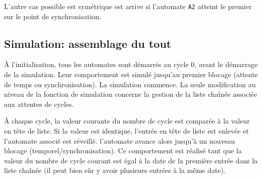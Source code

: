 \documentclass[11pt,a4paper]{article}
\begin{document}
L'autre cas possible est symétrique est arrive si l'automate \texttt{A2} atteint le premier sur le point de synchronisation.

\subsection{Simulation: assemblage du tout}

À l'initialisation, tous les automates sont démarrés au cycle 0, avant le démarrage de la simulation. Leur comportement est simulé jusqu'au premier blocage (attente de temps ou synchronisation). La simulation commence. La seule modification au niveau de la fonction de simulation concerne la gestion de la liste chaînée associée aux attentes de cycles.

À chaque cycle, la valeur courante du nombre de cycle est comparée à la valeur en tête de liste. Si la valeur est identique, l'entrée en tête de liste est enlevée et l'automate associé est réveillé. l'automate avance alors jusqu'à un nouveau blocage (temporel/synchronisation). Ce comportement est réalisé tant que la valeur du nombre de cycle courant est égal à la date de la première entrée dans la liste chaînée (il peut bien sûr y avoir plusieurs entrées à la même date).

 
\end{document}

